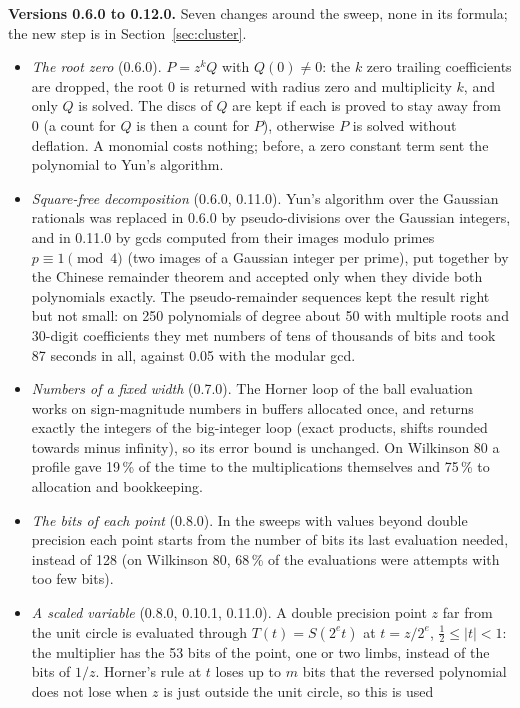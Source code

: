 \documentclass[10pt,a4paper]{article}
\theoremstyle{definition}
\numberwithin{equation}{section}
\begin{document}
\textbf{Versions 0.6.0 to 0.12.0.} Seven changes around the sweep, none in its formula; the new step is
in Section~\ref{sec:cluster}.
\begin{itemize}
\item \emph{The root zero} (0.6.0). $P=z^kQ$ with $Q(0)\ne0$: the $k$ zero trailing coefficients are
 dropped, the root $0$ is returned with radius zero and multiplicity $k$, and only $Q$ is solved. The
 discs of $Q$ are kept if each is proved to stay away from $0$ (a count for $Q$ is then a count for $P$),
 otherwise $P$ is solved without deflation. A monomial costs nothing; before, a zero constant term sent
 the polynomial to Yun's algorithm.
\item \emph{Square-free decomposition} (0.6.0, 0.11.0). Yun's algorithm over the Gaussian rationals was
 replaced in 0.6.0 by pseudo-divisions over the Gaussian integers, and in 0.11.0 by gcds computed from
 their images modulo primes $p\equiv1\pmod 4$ (two images of a Gaussian integer per prime), put
 together by the Chinese remainder theorem and accepted only when they divide both polynomials exactly.
 The pseudo-remainder sequences kept the result right but not small: on 250 polynomials of degree about
 50 with multiple roots and 30-digit coefficients they met numbers of tens of thousands of bits and took
 87 seconds in all, against 0.05 with the modular gcd.
\item \emph{Numbers of a fixed width} (0.7.0). The Horner loop of the ball evaluation works on
 sign-magnitude numbers in buffers allocated once, and returns exactly the integers of the big-integer
 loop (exact products, shifts rounded towards minus infinity), so its error bound is unchanged. On
 Wilkinson 80 a profile gave 19\,\% of the time to the multiplications themselves and 75\,\% to
 allocation and bookkeeping.
\item \emph{The bits of each point} (0.8.0). In the sweeps with values beyond double precision each point
 starts from the number of bits its last evaluation needed, instead of 128 (on Wilkinson 80, 68\,\% of
 the evaluations were attempts with too few bits).
\item \emph{A scaled variable} (0.8.0, 0.10.1, 0.11.0). A double precision point $z$ far from the unit
 circle is evaluated through $T(t)=S(2^et)$ at $t=z/2^e$, $\frac12\le|t|<1$: the multiplier has the 53
 bits of the point, one or two limbs, instead of the bits of $1/z$. Horner's rule at $t$ loses up to $m$
 bits that the reversed polynomial does not lose when $z$ is just outside the unit circle, so this is used

\end{itemize}
\end{document}
